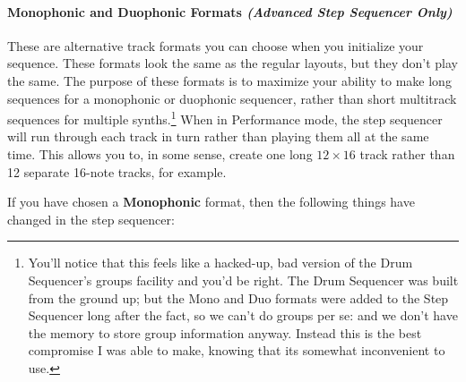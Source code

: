 \documentclass{article}
\begin{document}
\paragraph{Monophonic and Duophonic Formats {\it (Advanced Step Sequencer Only)}}
These are alternative track formats you can choose when you initialize your sequence. These formats look the same as the regular layouts, but they don't play the same.  The purpose of these formats is to maximize your ability to make long sequences for a monophonic or duophonic sequencer, rather than short multitrack sequences for multiple synths.\footnote{You'll notice that this feels like a hacked-up, bad version of the Drum Sequencer's groups facility and you'd be right.  The Drum Sequencer was built from the ground up; but the Mono and Duo formats were added to the Step Sequencer long after the fact, so we can't do groups per se: and we don't have the memory to store group information anyway.  Instead this is the best   compromise I was able to make, knowing that its somewhat inconvenient to use.} When in Performance mode, the step sequencer will run through each track in turn rather than playing them all at the same time.  This allows you to, in some sense, create one long \(12 \times 16\) track rather than 12 separate 16-note tracks, for example.

If you have chosen a {\bf Monophonic} format, then the following things have changed in the step sequencer:
\end{document}
